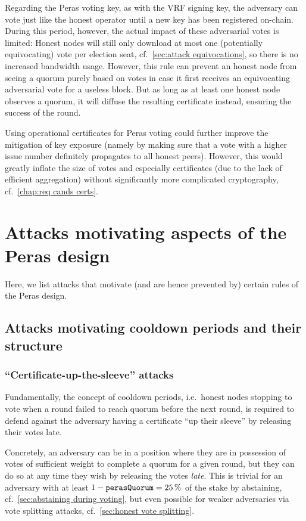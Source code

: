 Regarding the Peras voting key, as with the VRF signing key, the adversary can vote just like the honest operator until a new key has been registered on-chain.
During this period, however, the actual impact of these adversarial votes is limited:
Honest nodes will still only download at most one (potentially equivocating) vote per election seat, cf.~\cref{sec:attack equivocations}, so there is no increased bandwidth usage.
However, this rule can prevent an honest node from seeing a quorum purely based on votes in case it first receives an equivocating adversarial vote for a useless block.
But as long as at least one honest node observes a quorum, it will diffuse the resulting certificate instead, ensuring the success of the round.

Using operational certificates for Peras voting could further improve the mitigation of key exposure (namely by making sure that a vote with a higher issue number definitely propagates to all honest peers).
However, this would greatly inflate the size of votes and especially certificates (due to the lack of efficient aggregation) without significantly more complicated cryptography, cf.~\cref{chap:req cands certs}.

\section{Attacks motivating aspects of the Peras design}

Here, we list attacks that motivate (and are hence prevented by) certain rules of the Peras design.

\subsection{Attacks motivating cooldown periods and their structure}\label{sec:attack cooldowns}

\subsubsection{\enquote{Certificate-up-the-sleeve} attacks}

Fundamentally, the concept of cooldown periods, i.e.\ honest nodes stopping to vote when a round failed to reach quorum before the next round, is required to defend against the adversary having a certificate \enquote{up their sleeve} by releasing their votes late.

Concretely, an adversary can be in a position where they are in possession of votes of sufficient weight to complete a quorum for a given round, but they can do so at any time they wish by releasing the votes \emph{late}.
This is trivial for an adversary with at least $1-\mathtt{perasQuorum} = \qty{25}{\percent}$ of the stake by abstaining, cf.~\cref{sec:abstaining during voting}, but even possible for weaker adversaries via vote splitting attacks, cf.~\cref{sec:honest vote splitting}.

